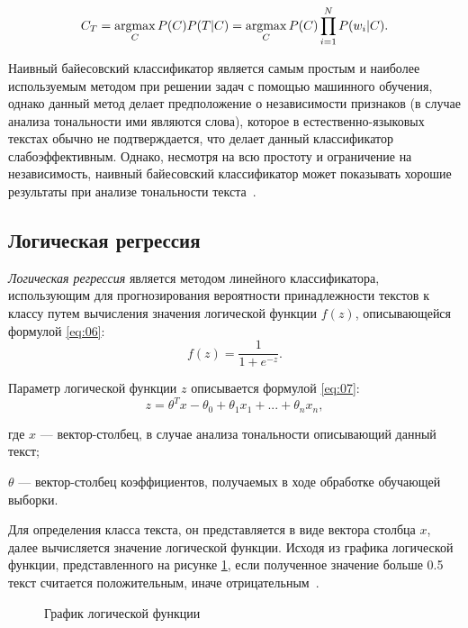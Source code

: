 \begin{equation}\label{eq:06}
    C_T = \operatorname*{argmax}_C P(C)P(T|C) = \operatorname*{argmax}_C P(C)\prod\limits_{i=1}^{N} P(w_i|C).
\end{equation}

Наивный байесовский классификатор является самым простым и наиболее
используемым методом при решении задач с помощью машинного обучения,
однако данный метод делает предположение о независимости признаков (в случае
анализа тональности ими являются слова), которое в естественно-языковых текстах
обычно не подтверждается, что делает данный классификатор слабоэффективным.
Однако, несмотря на всю простоту и ограничение на независимость, наивный
байесовский классификатор может показывать хорошие результаты при анализе
тональности текста~\cite{article9}.

\subsection{Логическая регрессия}

\textit{Логическая регрессия} является методом линейного классификатора,
использующим для прогнозирования вероятности принадлежности текстов к классу
путем вычисления значения логической функции $f(z)$, описывающейся формулой
\ref{eq:06}:
\begin{equation}\label{eq:06}
    f(z) = \frac{1}{1+e^{-z}}.
\end{equation}

Параметр логической функции $z$ описывается формулой \ref{eq:07}:
\begin{equation}\label{eq:07}
    z = \theta^Tx-\theta_0+\theta_1x_1+...+\theta_nx_n,
\end{equation}

где $x$ --- вектор-столбец, в случае анализа тональности описывающий данный
текст;

$\theta$ --- вектор-столбец коэффициентов, получаемых в ходе обработке
обучающей выборки.

Для определения класса текста, он представляется в виде вектора столбца $x$,
далее вычисляется значение логической функции. Исходя из графика логической
функции, представленного на рисунке \ref{img:01}, если полученное значение
больше 0.5 текст считается положительным, иначе отрицательным~\cite{article22}.

\begin{figure}[h!]
    \begin{center}
    \end{center}
    \caption{График логической функции}\label{img:01}
\end{figure}

